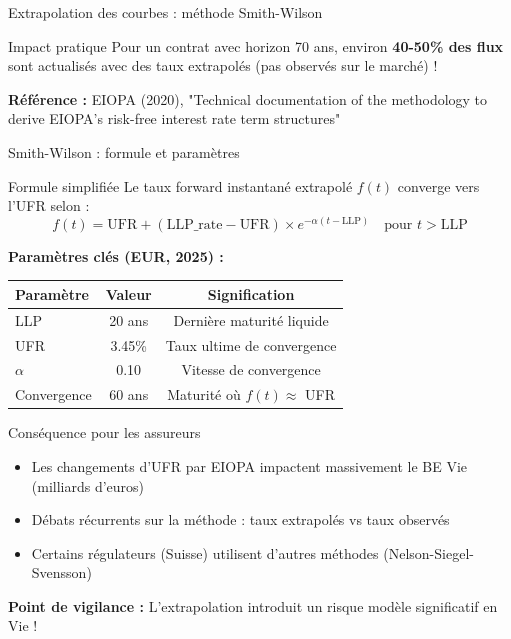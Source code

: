 \documentclass[10pt,aspectratio=169]{beamer}
\newcommand{\highlight}[1]{\textbf{\color{rougeactu}#1}}
\begin{document}
\begin{frame}{Extrapolation des courbes : méthode Smith-Wilson}
\vspace{0.2cm}
\begin{alertblock}{Impact pratique}
Pour un contrat avec horizon 70 ans, environ \highlight{40-50\% des flux} sont actualisés avec des taux extrapolés (pas observés sur le marché) !
\end{alertblock}

\textbf{Référence :} EIOPA (2020), "Technical documentation of the methodology to derive EIOPA's risk-free interest rate term structures"
\end{frame}

\begin{frame}{Smith-Wilson : formule et paramètres}
\begin{block}{Formule simplifiée}
Le taux forward instantané extrapolé $f(t)$ converge vers l'UFR selon :
\[
f(t) = \text{UFR} + (\text{LLP\_rate} - \text{UFR}) \times e^{-\alpha(t - \text{LLP})} \quad \text{pour } t > \text{LLP}
\]
\end{block}

\textbf{Paramètres clés (EUR, 2025) :}
\begin{table}
\centering
\small
\begin{tabular}{lcc}
\toprule
\textbf{Paramètre} & \textbf{Valeur} & \textbf{Signification} \\
\midrule
\rowcolor{bleuactu!10}
LLP & 20 ans & Dernière maturité liquide \\
UFR & 3.45\% & Taux ultime de convergence \\
\rowcolor{bleuactu!10}
$\alpha$ & 0.10 & Vitesse de convergence \\
Convergence & 60 ans & Maturité où $f(t) \approx$ UFR \\
\bottomrule
\end{tabular}
\end{table}

\begin{exampleblock}{Conséquence pour les assureurs}
\begin{itemize}
    \item Les changements d'UFR par EIOPA impactent massivement le BE Vie (milliards d'euros)
    \item Débats récurrents sur la méthode : taux extrapolés vs taux observés
    \item Certains régulateurs (Suisse) utilisent d'autres méthodes (Nelson-Siegel-Svensson)
\end{itemize}
\end{exampleblock}

\textbf{Point de vigilance :} L'extrapolation introduit un risque modèle significatif en Vie !
\end{frame}
\end{document}
